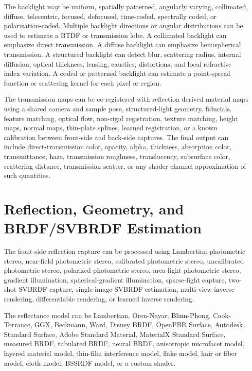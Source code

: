 \documentclass[11pt, twoside, listof=totocnumbered, bibliography=totocnumbered]{scrartcl}
\begin{document}
	The backlight may be uniform, spatially patterned, angularly varying, collimated, diffuse, telecentric, focused, defocused, time-coded, spectrally coded, or polarization-coded. Multiple backlight directions or angular distributions can be used to estimate a BTDF or transmission lobe. A collimated backlight can emphasize direct transmission. A diffuse backlight can emphasize hemispherical transmission. A structured backlight can detect blur, scattering radius, internal diffusion, optical thickness, lensing, caustics, distortions, and local refractive index variation. A coded or patterned backlight can estimate a point-spread function or scattering kernel for each pixel or region.
	
	The transmission maps can be co-registered with reflection-derived material maps using a shared camera and sample pose, structured-light geometry, fiducials, feature matching, optical flow, non-rigid registration, texture matching, height maps, normal maps, thin-plate splines, learned registration, or a known calibration between front-side and back-side captures. The final output can include direct-transmission color, opacity, alpha, thickness, absorption color, transmittance, haze, transmission roughness, translucency, subsurface color, scattering distance, transmission scatter, or any shader-channel approximation of such quantities.
	
	\section{Reflection, Geometry, and BRDF/SVBRDF Estimation}
	The front-side reflection capture can be processed using Lambertian photometric stereo, near-field photometric stereo, calibrated photometric stereo, uncalibrated photometric stereo, polarized photometric stereo, area-light photometric stereo, gradient illumination, spherical-gradient illumination, sparse-light capture, two-shot SVBRDF capture, single-image SVBRDF estimation, multi-view inverse rendering, differentiable rendering, or learned inverse rendering. \cite{AITTALA2015,DESCHAINTRE2018,GAO2019,HWANG2022}
	
	The reflectance model can be Lambertian, Oren-Nayar, Blinn-Phong, Cook-Torrance, GGX, Beckmann, Ward, Disney BRDF, OpenPBR Surface, Autodesk Standard Surface, Adobe Standard Material, MaterialX Standard Surface, measured BRDF, tabulated BRDF, neural BRDF, anisotropic microfacet model, layered material model, thin-film interference model, flake model, hair or fiber model, cloth model, BSSRDF model, or a custom shader. \cite{DISNEY_BRDF,OPENPBR,MATERIALX}
	
\end{document}

